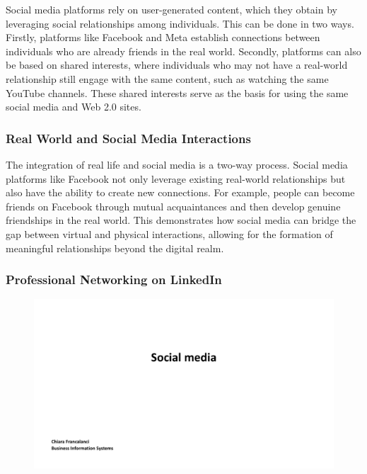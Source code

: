 Social media platforms rely on user-generated content, which they obtain
by leveraging social relationships among individuals. This can be done
in two ways. Firstly, platforms like Facebook and Meta establish
connections between individuals who are already friends in the real
world. Secondly, platforms can also be based on shared interests, where
individuals who may not have a real-world relationship still engage with
the same content, such as watching the same YouTube channels. These
shared interests serve as the basis for using the same social media and
Web 2.0 sites.

\subsubsection{Real World and Social Media
    Interactions}\label{real-world-and-social-media-interactions}

The integration of real life and social media is a two-way process.
Social media platforms like Facebook not only leverage existing
real-world relationships but also have the ability to create new
connections. For example, people can become friends on Facebook through
mutual acquaintances and then develop genuine friendships in the real
world. This demonstrates how social media can bridge the gap between
virtual and physical interactions, allowing for the formation of
meaningful relationships beyond the digital realm.

\subsubsection{Professional Networking on
    LinkedIn}\label{professional-networking-on-linkedin}

\begin{figure}[!h]
    \centering
    \includegraphics[page=3, trim = 1.5cm 4cm 3cm 4cm, clip, width=\textwidth]{images/04 - Social_Media.pdf}
\end{figure}

